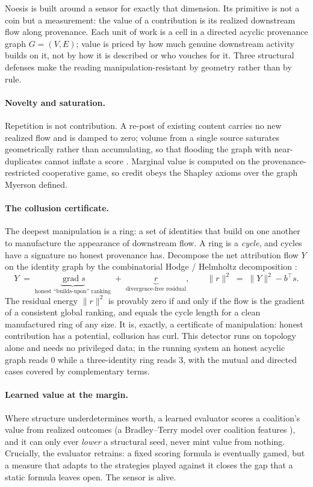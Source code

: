\documentclass[10pt]{article}
\begin{document}
Noesis is built around a sensor for exactly that dimension. Its primitive is not a coin but a measurement:
the value of a contribution is its realized downstream flow along provenance. Each unit of work is a cell
in a directed acyclic provenance graph $G=(V,E)$; value is priced by how much genuine downstream activity
builds on it, not by how it is described or who vouches for it. Three structural defenses make the reading
manipulation-resistant by geometry rather than by rule.

\paragraph{Novelty and saturation.} Repetition is not contribution. A re-post of existing content carries
no new realized flow and is damped to zero; volume from a single source saturates geometrically rather
than accumulating, so that flooding the graph with near-duplicates cannot inflate a score
\cite{shapley1953,myerson1977}. Marginal value is computed on the provenance-restricted cooperative game,
so credit obeys the Shapley axioms over the graph Myerson defined.

\paragraph{The collusion certificate.} The deepest manipulation is a ring: a set of identities that build
on one another to manufacture the appearance of downstream flow. A ring is a \emph{cycle}, and cycles have
a signature no honest provenance has. Decompose the net attribution flow $Y$ on the identity graph by the
combinatorial Hodge / Helmholtz decomposition \cite{jiang2011}:
\[
Y \;=\; \underbrace{\operatorname{grad} s}_{\text{honest ``builds-upon'' ranking}} \;+\;
\underbrace{r}_{\text{divergence-free residual}}, \qquad
\|r\|^2 \;=\; \|Y\|^2 - b^{\!\top} s .
\]
The residual energy $\|r\|^2$ is provably zero if and only if the flow is the gradient of a consistent
global ranking, and equals the cycle length for a clean manufactured ring of any size. It is, exactly, a
certificate of manipulation: honest contribution has a potential, collusion has curl. This detector runs
on topology alone and needs no privileged data; in the running system an honest acyclic graph reads $0$
while a three-identity ring reads $3$, with the mutual and directed cases covered by complementary terms.

\paragraph{Learned value at the margin.} Where structure underdetermines worth, a learned evaluator scores
a coalition's value from realized outcomes (a Bradley--Terry model over coalition features
\cite{bradley1952}), and it can only ever \emph{lower} a structural seed, never mint value from nothing.
Crucially, the evaluator retrains: a fixed scoring formula is eventually gamed, but a measure that adapts
to the strategies played against it closes the gap that a static formula leaves open. The sensor is alive.
\end{document}
